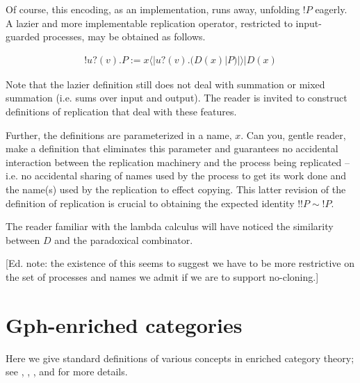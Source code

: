 \documentclass{llncs}
\newcommand{\lliftb}{\langle\!|}
\newcommand{\rliftb}{|\!\rangle}
\newcommand{\binpar}[2]{#1 | #2}
\newcommand{\prefix}[3]{#1?(#2) . #3}
\newcommand{\lift}[2]{#1 \lliftb #2 \rliftb}
\newcommand{\bangp}[1]{! #1}
\begin{document}
Of course, this encoding, as an implementation, runs away, unfolding
$\bangp{P}$ eagerly. A lazier and more implementable replication
operator, restricted to input-guarded processes, may be obtained as follows.

\begin{eqnarray}
\bangp{\prefix{u}{v}{P}} 
	:= 
	\binpar{\lift{x}{\prefix{u}{v}{(\binpar{D(x)}{P})}}}{D(x)} \nonumber
\end{eqnarray}

\begin{remark}
  Note that the lazier definition still does not deal with summation
  or mixed summation (i.e. sums over input and output). The reader is
  invited to construct definitions of replication that deal with these
  features. 

  Further, the definitions are parameterized in a name, $x$. Can you,
  gentle reader, make a definition that eliminates this parameter and
  guarantees no accidental interaction between the replication
  machinery and the process being replicated -- i.e. no accidental
  sharing of names used by the process to get its work done and the
  name(s) used by the replication to effect copying. This latter
  revision of the definition of replication is crucial to obtaining
  the expected identity $!!P \sim !P$.
\end{remark}

\begin{remark}\label{rem:paradoxical_combinator}
  The reader familiar with the lambda calculus will have noticed the
  similarity between $D$ and the paradoxical combinator.

  [Ed. note: the existence of this seems to suggest we have to be more
  restrictive on the set of processes and names we admit if we are to
  support no-cloning.]
\end{remark}

\section{Gph-enriched categories}
Here we give standard definitions of various concepts in enriched category theory; see \cite{Kelly},
\cite{Power},
\cite{LackRosicky},
and \cite{Trimble} for more details.
\end{document}
